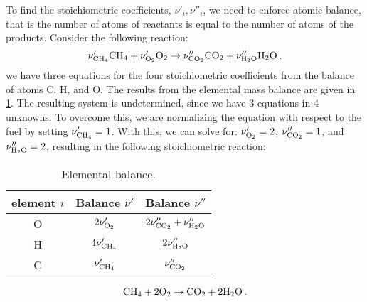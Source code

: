 To find the stoichiometric coefficients, $\nu'_i, \nu''_i$, we need to enforce atomic balance, that is the number of atoms of reactants is equal to the number of atoms of the products. Consider the following reaction:
\[
  \nu'_{\mathrm{CH_4}} \mathrm{CH_4} + \nu'_{\mathrm{O_2}} \mathrm{O_2} \rightarrow \nu''_{\mathrm{CO_2}} \mathrm{CO_2} + \nu''_{\mathrm{H_2O}} \mathrm{H_2O} \, \text{,}
\]
we have three equations for the four stoichiometric coefficients from the balance of atoms C, H, and O. The results from the elemental mass balance are given in \cref{TAB_ELEMENT_BALANCE}. The resulting system is undetermined, since we have 3 equations in 4 unknowns. To overcome this, we are normalizing the equation with respect to the fuel by setting $\nu'_{\mathrm{CH_4}} = 1$. With this, we can solve for: $\nu'_{\mathrm{O_2}}=2$, $\nu''_{\mathrm{CO_2}}=1$, and  $\nu''_{\mathrm{H_2O}}=2$, resulting in the following stoichiometric reaction:
\begin{table}[!tb!]
\centering
\begin{tabular}{|c|cc|}\hline
element $i$ & Balance $\nu'$ & Balance $\nu''$ \\\hline\hline
O & $2\nu'_{\mathrm{O_2}}$ & $2\nu''_{\mathrm{CO_2}} + \nu''_{\mathrm{H_2O}}$ \\
H & $4\nu'_{\mathrm{CH_4}}$& $2\nu''_{\mathrm{H_2O}}$\\
C & $\nu'_{\mathrm{CH_4}}$ & $\nu''_{\mathrm{CO_2}}$ \\\hline
\end{tabular}
  \caption{\label{TAB_ELEMENT_BALANCE}Elemental balance.}
\end{table}
\[
  \mathrm{CH_4} + 2 \mathrm{O_2} \rightarrow \mathrm{CO_2} + 2\mathrm{H_2O} \, \text{.}
\] 

